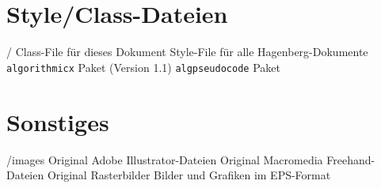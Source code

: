 \begin{comment}
\section{Dokumentation}
\begin{FileList}{/docs/}
\fitem{caption2.pdf}  \texttt{caption} Paket %
\fitem{fancyhdr.pdf} "`Fancy Headers"' Paket %
\fitem{float.pdf}     \texttt{float}
Paket \fitem{gerdoc.pdf}    Kurzbeschreibung zu \texttt{german.sty}
und \texttt{ngerman.sty} \fitem{grfguide.pdf}  \texttt{graphicx} Paket
\fitem{l2kurz.pdf}    \latex-Anleitung (deutsch)
\fitem{lshort.pdf}    \latex-Anleitung (englisch)
\fitem{subfigure.pdf} \texttt{subfigure} Paket
\fitem{symbols-a4.pdf} Verzeichnis aller \latex-Symbole
\end{FileList}
\end{comment}

\section{Style/Class-Dateien}
\begin{FileList}{/}
 Class-File für dieses Dokument
 Style-File für alle Hagenberg-Dokumente
  \texttt{algorithmicx} Paket (Version 1.1) 
 \texttt{algpseudocode} Paket 
\end{FileList}


\section{Sonstiges}
\begin{FileList}{/images}
 Original Adobe Illustrator-Dateien %
 Original Macromedia Freehand-Dateien %
 Original Rasterbilder %
 Bilder und Grafiken im EPS-Format%
\end{FileList}
